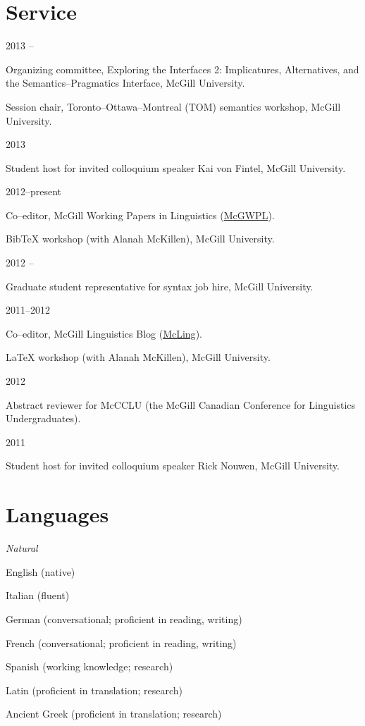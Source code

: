 \documentclass[11pt,letterpaper]{article}
\newcommand{\cvitem}[2]{%
  \begin{minipage}[t]{0.24\textwidth}
    #1 %
  \end{minipage}
  \hfill
  \begin{minipage}[t]{0.74\textwidth}
    #2 %
  \end{minipage}
}
\renewenvironment{itemize}{%
  \begin{list}{}{%
    \setlength{\itemsep}{0.5em}
    \setlength{\leftmargin}{0em}
  }
}{%
  \end{list}
}
\begin{document}
\section*{Service}

\cvitem{2013 \shortmonthname[4]--\shortmonthname[5]}{Organizing committee,
Exploring the Interfaces 2: Implicatures, Alternatives, and the
Semantics--Pragmatics Interface, McGill University.}

\cvitem{}{Session chair, Toronto--Ottawa--Montreal
(TOM) semantics workshop, McGill University.}

\cvitem{2013 \shortmonthname[1]}{Student host for invited colloquium speaker
Kai von Fintel, McGill University.}

\cvitem{2012--present}{Co--editor, McGill Working Papers in Linguistics
(\href{http://www.mcgill.ca/mcgwpl/}{McGWPL}).}

\cvitem{}{Bib\TeX{} workshop (with Alanah McKillen),
McGill University.}

\cvitem{2012 \shortmonthname[5]--\shortmonthname[6]}{Graduate student
representative for syntax job hire, McGill University.}

\cvitem{2011--2012}{Co--editor, McGill Linguistics Blog
(\href{https://blogs.mcgill.ca/mcling/}{McLing}).}

\cvitem{}{\LaTeX{} workshop (with Alanah McKillen),
McGill University.}

\cvitem{2012 \shortmonthname[1]}{Abstract reviewer for McCCLU (the McGill
Canadian Conference for Linguistics Undergraduates).}

\cvitem{2011 \shortmonthname[12]}{Student host for invited colloquium speaker
Rick Nouwen, McGill University.}



\section*{Languages}

\cvitem{\textit{Natural}}{%
  \begin{itemize}
    \item English \hfill (native)
    \item Italian \hfill (fluent)
    \item German \hfill (conversational; proficient in reading, writing)
    \item French \hfill (conversational; proficient in reading, writing)
    \item Spanish \hfill (working knowledge; research)
    \item Latin \hfill (proficient in translation; research)
    \item Ancient Greek \hfill (proficient in translation; research)
  \end{itemize}
}
\end{document}
